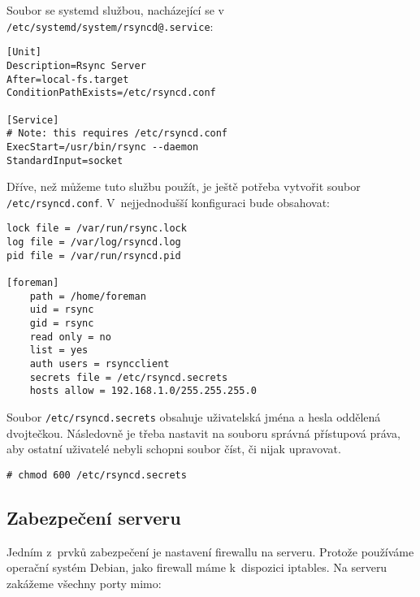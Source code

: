 Soubor se systemd službou, nacházející se v~\\\texttt{/etc/systemd/system/rsyncd@.service}:

\begin{verbatim}
[Unit]
Description=Rsync Server
After=local-fs.target
ConditionPathExists=/etc/rsyncd.conf

[Service]
# Note: this requires /etc/rsyncd.conf
ExecStart=/usr/bin/rsync --daemon
StandardInput=socket
\end{verbatim}



Dříve, než můžeme tuto službu použít, je ještě potřeba vytvořit soubor \texttt{/etc/rsyncd.conf}. V~nejjednodušší konfiguraci bude obsahovat:

\begin{verbatim}
lock file = /var/run/rsync.lock
log file = /var/log/rsyncd.log
pid file = /var/run/rsyncd.pid

[foreman]
    path = /home/foreman
    uid = rsync
    gid = rsync
    read only = no
    list = yes
    auth users = rsyncclient
    secrets file = /etc/rsyncd.secrets
    hosts allow = 192.168.1.0/255.255.255.0
\end{verbatim}


Soubor \texttt{/etc/rsyncd.secrets} obsahuje uživatelská jména a hesla oddělená dvojtečkou. Následovně je třeba nastavit na souboru správná přístupová práva, aby ostatní uživatelé nebyli schopni soubor číst, či nijak upravovat.
\begin{verbatim}
# chmod 600 /etc/rsyncd.secrets
\end{verbatim}


\subsection{Zabezpečení serveru}

Jedním z~prvků zabezpečení je nastavení firewallu na serveru. Protože používáme operační systém Debian, jako firewall máme k~dispozici iptables. Na serveru zakážeme všechny porty mimo:

